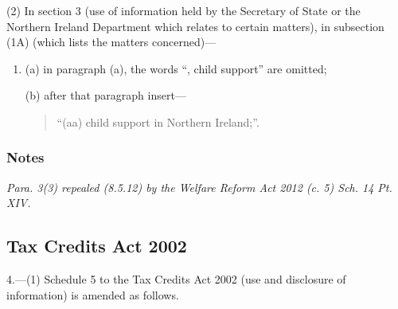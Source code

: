 \documentclass[a4paper]{article}
\newcommand\amendment[1]{\subsubsection*{Notes}{\itshape\frenchspacing\footnotesize #1 \par}}
\begin{document}
(2) In section 3 (use of information held by the Secretary of State or the Northern Ireland Department which relates to certain matters), in subsection (1A) (which lists the matters concerned)—
\begin{enumerate}\item[]
(a) in paragraph (a), the words “, child support” are omitted;

(b) after that paragraph insert—
\begin{quotation}
“(aa) child support in Northern Ireland;”.
\end{quotation}
\end{enumerate}


\amendment{
Para. 3(3) repealed (8.5.12) by the Welfare Reform Act 2012 (c. 5) Sch. 14 Pt. XIV.
}

\subsection*{Tax Credits Act 2002}

4.---(1) Schedule 5 to the Tax Credits Act 2002 (use and disclosure of information) is amended as follows.
\end{document}
